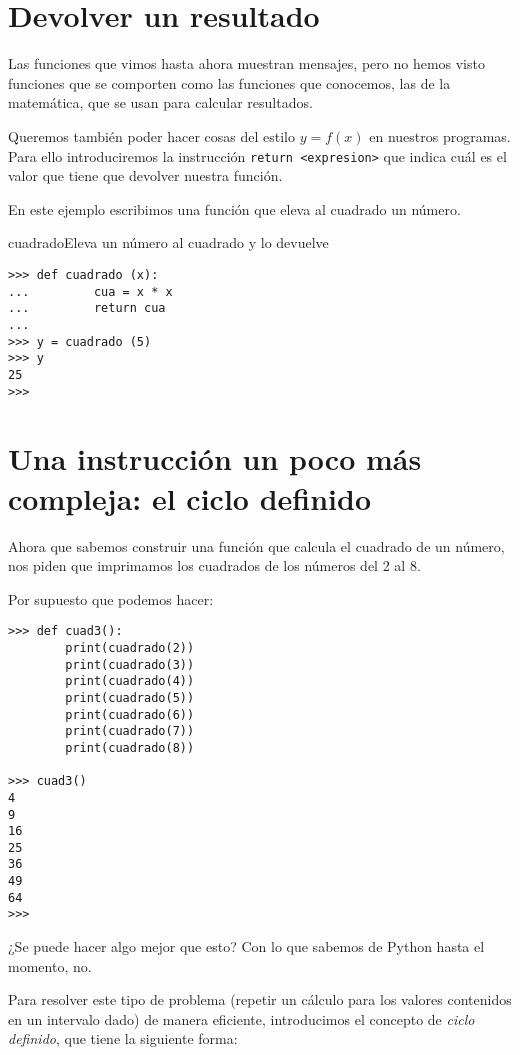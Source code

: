 \section{Devolver un resultado}

Las funciones que vimos hasta ahora muestran mensajes,
pero no hemos visto funciones que se comporten como las
funciones que conocemos, las de la matemática, que
se usan para calcular resultados.

Queremos también poder hacer cosas del estilo $y=f(x)$
en nuestros programas.
Para ello introduciremos la instrucción \lstinline!return <expresion>!
que indica cuál es el valor que tiene que devolver nuestra función.

En este ejemplo escribimos una función que eleva al cuadrado un número.

\begin{codigo}{cuadrado}{Eleva un número al cuadrado y lo devuelve}
\label{cuadrado}
\begin{lstlisting}[numbers=none]
>>> def cuadrado (x):
...         cua = x * x
...         return cua
...
>>> y = cuadrado (5)
>>> y
25
>>>
\end{lstlisting}
\end{codigo}

\section{Una instrucción un poco más compleja: el ciclo definido}

\begin{problema}Ahora que sabemos construir una función que calcula el cuadrado de un número,
nos piden que imprimamos los cuadrados de los números del 2 al 8.
\end{problema}

\begin{solucion}
Por supuesto que podemos hacer:
\begin{lstlisting}[numbers=none]
>>> def cuad3():
        print(cuadrado(2))
        print(cuadrado(3))
        print(cuadrado(4))
        print(cuadrado(5))
        print(cuadrado(6))
        print(cuadrado(7))
        print(cuadrado(8))

>>> cuad3()
4
9
16
25
36
49
64
>>>
\end{lstlisting}
\end{solucion}

¿Se puede hacer algo mejor que esto? Con lo que sabemos de Python hasta el momento, no.

Para resolver este tipo de problema (repetir un cálculo para los valores
contenidos en un intervalo dado) de manera eficiente, introducimos el concepto
de {\it ciclo definido}, que tiene la siguiente forma:

